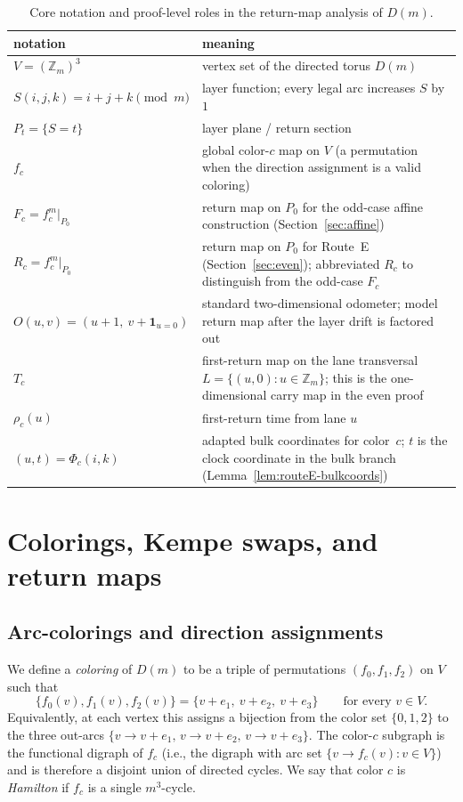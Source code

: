 \documentclass[11pt]{article}
\begin{document}
\begin{table}[t]
\centering
\footnotesize
\begin{tabularx}{\textwidth}{@{}l>{\raggedright\arraybackslash}X@{}}
\toprule
notation & meaning \\
\midrule
$V=(\mathbb Z_m)^3$ & vertex set of the directed torus $D(m)$ \\
$S(i,j,k)=i+j+k\pmod m$ & layer function; every legal arc increases $S$ by $1$ \\
$P_t=\{S=t\}$ & layer plane / return section \\
$f_c$ & global color-$c$ map on $V$ (a permutation when the direction assignment is a valid coloring) \\
$F_c=f_c^m|_{P_0}$ & return map on $P_0$ for the odd-case affine construction (Section~\ref{sec:affine}) \\
$R_c=f_c^m|_{P_0}$ & return map on $P_0$ for Route~E (Section~\ref{sec:even}); abbreviated $R_c$ to distinguish from the odd-case $F_c$ \\
$O(u,v)=(u+1,\ v+\mathbf 1_{u=0})$ & standard two-dimensional odometer; model return map after the layer drift is factored out \\
$T_c$ & first-return map on the lane transversal $L=\{(u,0):u\in\mathbb Z_m\}$; this is the one-dimensional carry map in the even proof \\
$\rho_c(u)$ & first-return time from lane $u$ \\
$(u,t)=\Phi_c(i,k)$ & adapted bulk coordinates for color~$c$; $t$ is the clock coordinate in the bulk branch (Lemma~\ref{lem:routeE-bulkcoords}) \\
\bottomrule
\end{tabularx}
\caption{Core notation and proof-level roles in the return-map analysis of $D(m)$.}
\label{tab:notation}
\end{table}

\section{Colorings, Kempe swaps, and return maps}\label{sec:prelim}

\subsection{Arc-colorings and direction assignments}
We define a \emph{coloring} of $D(m)$ to be a triple of permutations $(f_0,f_1,f_2)$ on $V$ such that
\[
\{f_0(v),f_1(v),f_2(v)\}=\{v+e_1,\ v+e_2,\ v+e_3\}
\qquad\text{for every }v\in V.
\]
Equivalently, at each vertex this assigns a bijection from the color set $\{0,1,2\}$ to the three out-arcs $\{v\to v+e_1,\, v\to v+e_2,\, v\to v+e_3\}$.
The color-$c$ subgraph is the functional digraph of $f_c$ (i.e., the digraph with arc set $\{v\to f_c(v):v\in V\}$) and is therefore a disjoint union of directed cycles.
We say that color $c$ is \emph{Hamilton} if $f_c$ is a single $m^3$-cycle.
\end{document}
